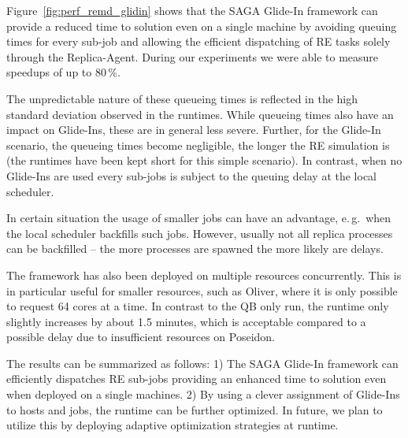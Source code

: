 \documentclass[conference,final]{IEEEtran}
\begin{document}
Figure~\ref{fig:perf_remd_glidin} shows that the SAGA Glide-In framework can provide
a reduced time to solution even on a single machine by avoiding queuing times for 
every sub-job and allowing the efficient dispatching of RE tasks solely through the 
Replica-Agent. During our experiments we were able to measure speedups of up to 80\,\%.

The unpredictable nature of these queueing times is reflected in the high standard deviation 
observed in the runtimes. While queueing times also have an impact on Glide-Ins, these are in general less
severe.  Further, for the Glide-In scenario, the queueing times become negligible, 
the longer the RE simulation is (the runtimes have been
kept short for this simple scenario). In contrast, when no Glide-Ins are used every sub-jobs 
is subject to the queuing delay at the local scheduler.


In certain situation the usage of smaller jobs can have an advantage, 
e.\,g.\ when the local scheduler backfills such jobs. However, usually not all replica processes can be
backfilled -- the more processes are spawned the more likely are delays. 

The framework has also been deployed on multiple resources concurrently. This is in particular useful
for smaller resources, such as Oliver, where it is only possible to request 64 cores at a
time. In contrast to the QB only run, the runtime only slightly increases by about 1.5 minutes, which is 
acceptable compared to a possible delay due to insufficient resources on Poseidon.

The results can be summarized as follows: 1) The SAGA Glide-In framework can 
efficiently dispatches RE sub-jobs providing an enhanced time to solution even 
when deployed on a single machines. 2) By using a clever assignment of 
Glide-Ins to hosts and jobs, the runtime can 
be further optimized. In future, we plan to utilize this by deploying 
adaptive optimization strategies at runtime.

\end{document}
